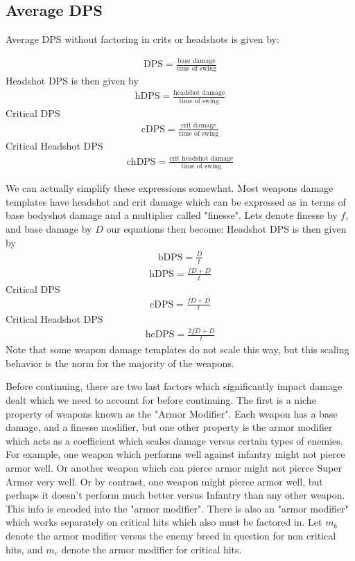 \documentclass{article}
\begin{document}
\subsection{Average DPS}
Average DPS without factoring in crits or headshots is given by:

\begin{align*}
\text{DPS} = \frac{\text{base damage}}{\text{time of swing}}
\end{align*}
Headshot DPS is then given by
\begin{align*}
\text{hDPS} = \frac{\text{headshot damage}}{\text{time of swing}}
\end{align*}
Critical DPS
\begin{align*}
\text{cDPS} = \frac{\text{crit damage}}{\text{time of swing}}
\end{align*}
Critical Headshot DPS
\begin{align*}
\text{chDPS} = \frac{\text{crit headshot damage}}{\text{time of swing}}
\end{align*}

We can actually simplify these expressions somewhat. Most weapons damage templates have headshot and crit damage which can be expressed as in terms of base bodyshot damage and a multiplier called "finesse". Lets denote finesse by $f$, and base damage by $D$ our equations then become:
Headshot DPS is then given by
\begin{align*}
\text{bDPS} = \frac{D}{t}
\end{align*}
\begin{align*}
\text{hDPS} = \frac{f D+D}{t}
\end{align*}
Critical DPS
\begin{align*}
\text{cDPS} = \frac{f D+D}{t}
\end{align*}
Critical Headshot DPS
\begin{align*}
\text{hcDPS} = \frac{2f D+D}{t}
\end{align*}
Note that some weapon damage templates do not scale this way, but this scaling behavior is the norm for the majority of the weapons.

Before continuing, there are two last factors which significantly impact damage dealt which we need to account for before continuing. The first is a niche property of weapons known as the "Armor Modifier". Each weapon has a base damage, and a finesse modifier, but one other property is the armor modifier which acts as a coefficient which scales damage versus certain types of enemies. For example, one weapon which performs well against infantry might not pierce armor well. Or another weapon which can pierce armor might not pierce Super Armor very well. Or by contrast, one weapon might pierce armor well, but perhaps it doesn't perform much better versus Infantry than any other weapon. This info is encoded into the "armor modifier". There is also an "armor modifier" which works separately on critical hits which also must be factored in. Let $m_b$ denote the armor modifier versus the enemy breed in question for non critical hits, and $m_c$ denote the armor modifier for critical hits.
\end{document}
